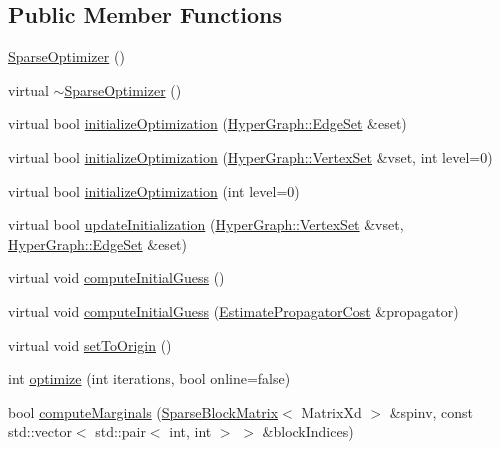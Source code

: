 \subsection*{Public Member Functions}
\begin{DoxyCompactItemize}
\item 
\hyperlink{classg2o_1_1SparseOptimizer_a00492515b99393555aec477ab486195b}{Sparse\+Optimizer} ()
\item 
virtual \hyperlink{classg2o_1_1SparseOptimizer_a3c3602d865a05486a94ce48c6839bbd6}{$\sim$\+Sparse\+Optimizer} ()
\item 
virtual bool \hyperlink{classg2o_1_1SparseOptimizer_a56c0c13954ac7204cfb031c141ece9ae}{initialize\+Optimization} (\hyperlink{classg2o_1_1HyperGraph_a5e2970e236c0dcb4eff7c205d7b6b4ae}{Hyper\+Graph\+::\+Edge\+Set} \&eset)
\item 
virtual bool \hyperlink{classg2o_1_1SparseOptimizer_ab16dd36e32577ba5856239ce721ec70b}{initialize\+Optimization} (\hyperlink{classg2o_1_1HyperGraph_a703938cdb4bb636860eed55a2489d70c}{Hyper\+Graph\+::\+Vertex\+Set} \&vset, int level=0)
\item 
virtual bool \hyperlink{classg2o_1_1SparseOptimizer_ace3994bf5f403c7fa0305635aa598473}{initialize\+Optimization} (int level=0)
\item 
virtual bool \hyperlink{classg2o_1_1SparseOptimizer_ae971d068585055973798f93ac2363d94}{update\+Initialization} (\hyperlink{classg2o_1_1HyperGraph_a703938cdb4bb636860eed55a2489d70c}{Hyper\+Graph\+::\+Vertex\+Set} \&vset, \hyperlink{classg2o_1_1HyperGraph_a5e2970e236c0dcb4eff7c205d7b6b4ae}{Hyper\+Graph\+::\+Edge\+Set} \&eset)
\item 
virtual void \hyperlink{classg2o_1_1SparseOptimizer_a59db9f16934d3b9f7a52511f0be1bb07}{compute\+Initial\+Guess} ()
\item 
virtual void \hyperlink{classg2o_1_1SparseOptimizer_a2fba11c8572fce4a8c1bcca4fa3e43fb}{compute\+Initial\+Guess} (\hyperlink{classg2o_1_1EstimatePropagatorCost}{Estimate\+Propagator\+Cost} \&propagator)
\item 
virtual void \hyperlink{classg2o_1_1SparseOptimizer_ab8af902464774ec3d3910a3674791714}{set\+To\+Origin} ()
\item 
int \hyperlink{classg2o_1_1SparseOptimizer_a098257ee6f13dbb79be07075244d9930}{optimize} (int iterations, bool online=false)
\item 
bool \hyperlink{classg2o_1_1SparseOptimizer_a656be8b8244a48dc1207f29eec77af5a}{compute\+Marginals} (\hyperlink{classg2o_1_1SparseBlockMatrix}{Sparse\+Block\+Matrix}$<$ Matrix\+Xd $>$ \&spinv, const std\+::vector$<$ std\+::pair$<$ int, int $>$ $>$ \&block\+Indices)

\end{DoxyCompactItemize}
